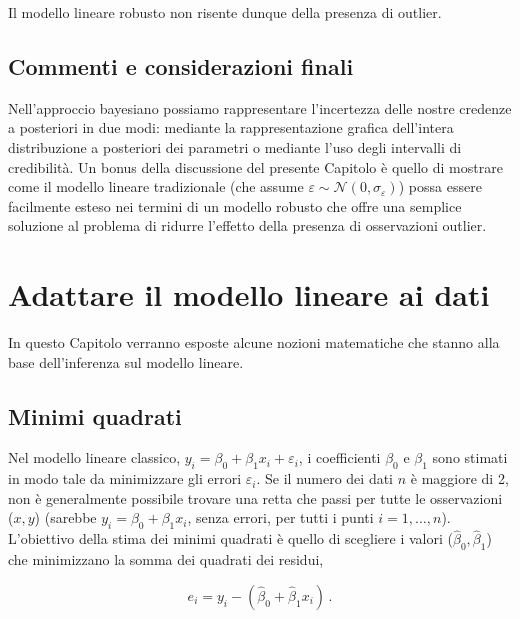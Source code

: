\documentclass[
  11pt,
]{krantz}
\theoremstyle{definition}
\theoremstyle{definition}
\theoremstyle{definition}
\theoremstyle{definition}
\theoremstyle{remark}
\begin{document}
Il modello lineare robusto non risente dunque della presenza di outlier.

\hypertarget{commenti-e-considerazioni-finali-2}{%
\section*{Commenti e considerazioni finali}\label{commenti-e-considerazioni-finali-2}}


Nell'approccio bayesiano possiamo rappresentare l'incertezza delle nostre credenze a posteriori in due modi: mediante la rappresentazione grafica dell'intera distribuzione a posteriori dei parametri o mediante l'uso degli intervalli di credibilità. Un bonus della discussione del presente Capitolo è quello di mostrare come il modello lineare tradizionale (che assume \(\varepsilon \sim \mathcal{N}(0, \sigma_{\varepsilon})\)) possa essere facilmente esteso nei termini di un modello robusto che offre una semplice soluzione al problema di ridurre l'effetto della presenza di osservazioni outlier.

\hypertarget{regr-ml}{%
\chapter{Adattare il modello lineare ai dati}\label{regr-ml}}

In questo Capitolo verranno esposte alcune nozioni matematiche che stanno alla base dell'inferenza sul modello lineare.

\hypertarget{minimi-quadrati}{%
\section{Minimi quadrati}\label{minimi-quadrati}}

Nel modello lineare classico, \(y_i = \beta_0 + \beta_1 x_i + \varepsilon_i\), i coefficienti \(\beta_0\) e \(\beta_1\) sono stimati in modo tale da minimizzare gli errori \(\varepsilon_i\). Se il numero dei dati \(n\) è maggiore di 2, non è generalmente possibile trovare una retta che passi per tutte le osservazioni (\(x, y\)) (sarebbe \(y_i = \beta_0 + \beta_1 x_i\), senza errori, per tutti i punti \(i = 1, \dots, n\)). L'obiettivo della stima dei minimi quadrati è quello di scegliere i valori (\(\hat{\beta}_0, \hat{\beta}_1\)) che minimizzano la somma dei quadrati dei residui,

\begin{equation}
e_i = y_i − (\hat{\beta}_0 + \hat{\beta}_1 x_i)\,.
\end{equation}
\end{document}
